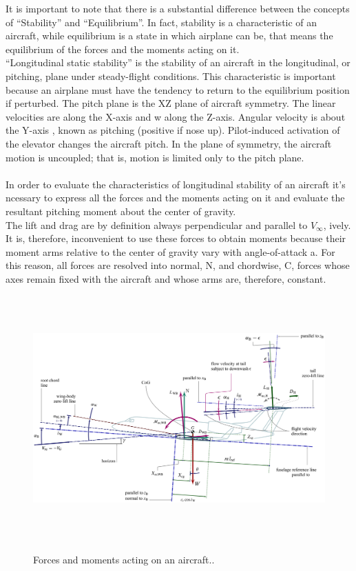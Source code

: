 It is important to note that there is a substantial difference between the concepts of ``Stability'' and ``Equilibrium''. In fact, stability is a characteristic of an aircraft, while equilibrium is a state in which airplane can be, that means the equilibrium of the forces and the moments acting on it.\\
``Longitudinal static stability'' is the stability of an aircraft in the longitudinal, or pitching, plane under steady-flight conditions. This characteristic is important because an airplane must have the tendency to return to the equilibrium position if perturbed. The pitch plane is the XZ plane of aircraft symmetry. The linear velocities are along the X-axis and w along the Z-axis. Angular velocity is about the Y-axis , known as pitching (positive if nose up). Pilot-induced activation of the elevator changes the aircraft pitch. In the plane of symmetry, the aircraft motion is uncoupled; that is, motion is limited only to the pitch plane.\cite{kundu}\\ \\
In order to evaluate the characteristics of longitudinal stability of an aircraft it's ncessary to express all the forces and the moments acting on it and evaluate the resultant pitching moment about the center of gravity.\\
 The lift and drag are by definition always perpendicular and parallel to $V_{\infty}$, 
ively. It is, therefore, inconvenient to use these forces to obtain moments because their moment arms relative to the center of gravity vary with angle-of-attack a. For this reason, all forces are resolved into normal, N, and chordwise, C, forces whose axes remain fixed with the aircraft and whose arms are, therefore, constant. \cite{nicolai2010fundamentals}\\

\begin{figure}[H]
\centering
{\includegraphics[height=9.4cm]{immagini/Longitudinal_Stability_Definitions_nc}} 
\label{longitudina}
\caption{Forces and moments acting on an aircraft..}
\end{figure} 	


